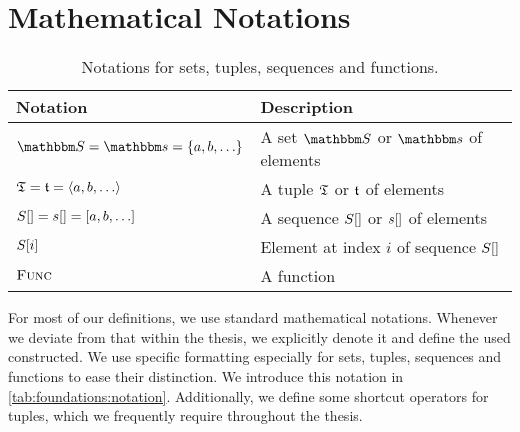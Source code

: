 \section{Mathematical Notations}
\label{chap:foundations:notations}

\begin{table}
    \centering
    \small
    \renewcommand{\arraystretch}{1.4}%
    \begin{tabular}{L{10em} L{17em}}
        \toprule
        \textbf{Notation} & \textbf{Description} \\
        \midrule
        $\set{S} = \set{s} = \setted{a, b, \ldots}$ 
            & A set $\set{S}$ or $\set{s}$ of elements\\
        $\mathfrak{T} = \mathfrak{t} = \langle a, b, \ldots \rangle$ 
            & A tuple $\mathfrak{T}$ or $\mathfrak{t}$ of elements\\
        $S[] = s[] = [a, b, \ldots]$ 
            & A sequence $S[]$ or $s[]$ of elements\\
        $S[i]$ 
            & Element at index $i$ of sequence $S[]$\\
        $\textsc{Func}$ 
            & A function\\
        \bottomrule
    \end{tabular}
    \caption[Notations for sets, tuples, sequences and functions]{Notations for sets, tuples, sequences and functions.}
    \label{tab:foundations:notation}
\end{table}

For most of our definitions, we use standard mathematical notations.
Whenever we deviate from that within the thesis, we explicitly denote it and define the used constructed.
We use specific formatting especially for sets, tuples, sequences and functions to ease their distinction.
We introduce this notation in \autoref{tab:foundations:notation}.
Additionally, we define some shortcut operators for tuples, which we frequently require throughout the thesis.

